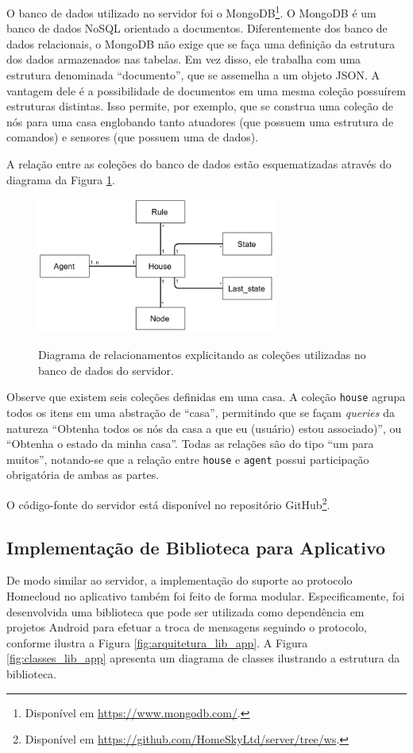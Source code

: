 O banco de dados utilizado no servidor foi o MongoDB\footnote{Disponível em \url{https://www.mongodb.com/}.}. O MongoDB é um banco de dados NoSQL orientado a documentos. Diferentemente dos banco de dados relacionais, o MongoDB não exige que se faça uma definição da estrutura dos dados armazenados nas tabelas. Em vez disso, ele trabalha com uma estrutura denominada ``documento'', que se assemelha a um objeto JSON. A vantagem dele é a possibilidade de documentos em uma mesma coleção possuírem estruturas distintas. Isso permite, por exemplo, que se construa uma coleção de nós para uma casa englobando tanto atuadores (que possuem uma estrutura de comandos) e sensores (que possuem uma de dados).

A relação entre as coleções do banco de dados estão esquematizadas através do diagrama da Figura \ref{fig:servidor_bd}.

\begin{figure}[h]
	\centering
	\caption{Diagrama de relacionamentos explicitando as coleções utilizadas no banco de dados do servidor.}
  \includegraphics[width=0.7\textwidth]{imagens/servidor_bd.png}
  \label{fig:servidor_bd}  
\end{figure}

Observe que existem seis coleções definidas em uma casa. A coleção \texttt{house} agrupa todos os itens em uma abstração de ``casa'', permitindo que se façam \textit{queries} da natureza ``Obtenha todos os nós da casa a que eu (usuário) estou associado)'', ou ``Obtenha o estado da minha casa''. Todas as relações são do tipo ``um para muitos'', notando-se que a relação entre \texttt{house} e \texttt{agent} possui participação obrigatória de ambas as partes.

O código-fonte do servidor está disponível no repositório GitHub\footnote{Disponível em \url{https://github.com/HomeSkyLtd/server/tree/ws}.}.

\subsection{Implementação de Biblioteca para Aplicativo}
De modo similar ao servidor, a implementação do suporte ao protocolo Homecloud no aplicativo também foi feito de forma modular. Especificamente, foi desenvolvida uma biblioteca que pode ser utilizada como dependência em projetos Android para efetuar a troca de mensagens seguindo o protocolo, conforme ilustra a Figura \ref{fig:arquitetura_lib_app}. A Figura \ref{fig:classes_lib_app} apresenta um diagrama de classes ilustrando a estrutura da biblioteca.


